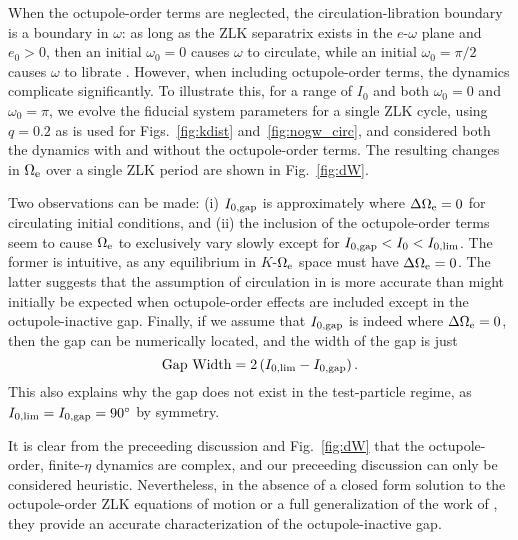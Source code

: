 \documentclass[
        fleqn,
        usenatbib,
    ]{mnras}
\newcommand*{\p}[1]{\left(#1\right)}
\begin{document}
When the octupole-order terms are neglected, the circulation-libration
boundary is a boundary in $\omega$: as long as the ZLK separatrix exists in the
$e$-$\omega$ plane and $e_0 > 0$, then an initial $\omega_0 = 0$ causes $\omega$
to circulate, while an initial $\omega_0 = \pi/2$ causes $\omega$ to librate
\citep[e.g.][]{kinoshita, shevchenko2016lidov}. However, when including
octupole-order terms, the dynamics complicate significantly. To illustrate this,
for a range of $I_0$ and both $\omega_0 = 0$ and $\omega_0 = \pi$, we evolve the
fiducial system parameters for a single ZLK cycle, using $q = 0.2$ as is used
for Figs.~\ref{fig:kdist} and~\ref{fig:nogw_circ}, and considered both the
dynamics with and without the octupole-order terms. The resulting changes in
$\Omega_{\rm e}$ over a single ZLK period are shown in Fig.~\ref{fig:dW}.

Two observations can be made: (i) $I_{\rm 0, gap}$ is approximately where
$\Delta \Omega_{\rm e} = 0$ for circulating initial conditions, and (ii) the
inclusion of the octupole-order terms seem to cause $\Omega_{\rm e}$ to
exclusively vary slowly except for $I_{\rm 0, gap} < I_0 < I_{0, \lim}$. The
former is intuitive, as any equilibrium in $K$-$\Omega_{\rm e}$ space must have
$\Delta \Omega_{\rm e} = 0$. The latter suggests that the assumption of
circulation in \citet{katz2011long} is more accurate than might initially be
expected when octupole-order effects are included except in the
octupole-inactive gap. Finally, if we assume that $I_{\rm 0, gap}$ is indeed
where $\Delta \Omega_{\rm e} = 0$, then the gap can be numerically located, and
the width of the gap is just
\begin{equation}
    \text{Gap Width} = 2\p{I_{0, \lim} - I_{\rm 0, gap}}.
\end{equation}
This also explains why the gap does not exist in the test-particle regime, as
$I_{0, \lim} = I_{\rm 0, gap} = 90^\circ$ by symmetry.

It is clear from the preceeding discussion and Fig.~\ref{fig:dW} that the
octupole-order, finite-$\eta$ dynamics are complex, and our preceeding
discussion can only be considered heuristic. Nevertheless, in the absence of a
closed form solution to the octupole-order ZLK equations of motion or a full
generalization of the work of \citet{katz2011long}, they provide an accurate
characterization of the octupole-inactive gap.
\end{document}
